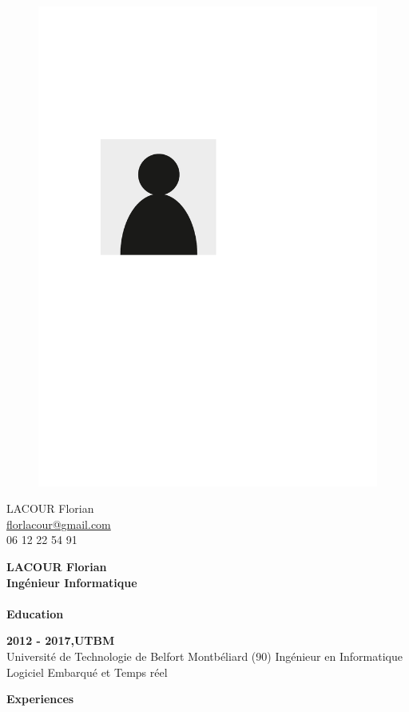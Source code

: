\documentclass[a4paper,11pt,final]{memoir}
\newcommand{\CVSection}[1]
	{\Large\textbf{#1}\par
	\normalsize\normalfont}
\newcommand{\CVItem}[1]
	{\textbf{\color{RoyalBlue} #1}}
\begin{document}
\begin{figure}
	\hfill
	\includegraphics[width=0.6\columnwidth]{photo}
	\vspace{-7cm}
\end{figure}

\begin{flushright}\small
	LACOUR Florian \\
	\url{florlacour@gmail.com}  \\
	06 12 22 54 91
\end{flushright}\normalsize
\framebreak


\Huge\bfseries {\color{RoyalBlue}  LACOUR Florian} \\
\Large\bfseries  Ingénieur Informatique \\ \\
\CVSection{Education}
\CVItem{2012  - 2017,UTBM }\\
Université de Technologie de Belfort Montbéliard (90) Ingénieur en Informatique Logiciel Embarqué et Temps réel 

\CVSection{Experiences}
\end{document}
